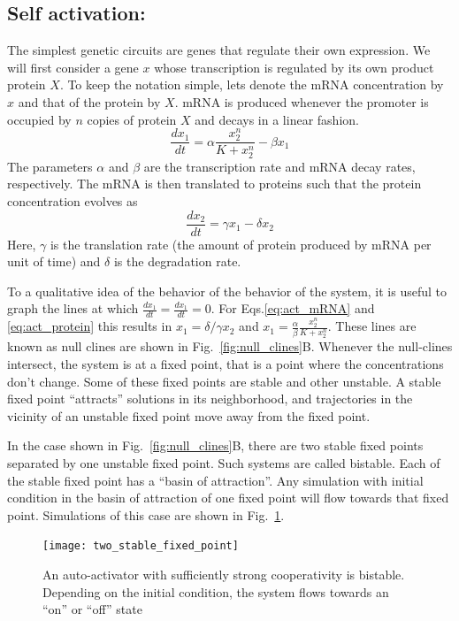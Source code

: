 \subsection*{Self activation:}
The simplest genetic circuits are genes that regulate their own expression.
We will first consider a gene $x$ whose transcription is regulated by its own product protein $X$.
To keep the notation simple, lets denote the mRNA concentration by $x$ and that of the protein by $X$.
mRNA is produced whenever the promoter is occupied by $n$ copies of protein $X$ and decays in a linear fashion.
\begin{equation}
\label{eq:act_mRNA}
	\frac{dx_1}{dt} = \alpha\frac{x_2^n}{K+x_2^n} - \beta x_1
\end{equation}
The parameters $\alpha$ and $\beta$ are the transcription rate and mRNA decay rates, respectively.
The mRNA is then translated to proteins such that the protein concentration evolves as
\begin{equation}
\label{eq:act_protein}
	\frac{dx_2}{dt} = \gamma x_1 - \delta x_2
\end{equation}
Here, $\gamma$ is the translation rate (the amount of protein produced by mRNA per unit of time) and $\delta$ is the degradation rate.

To a qualitative idea of the behavior of the behavior of the system, it is useful to graph the lines at which $\frac{dx_1}{dt}=\frac{dx_1}{dt}=0$.
For Eqs.\ref{eq:act_mRNA} and \ref{eq:act_protein} this results in $x_1=\delta/\gamma x_2$ and $x_1 = \frac{\alpha}{\beta}\frac{x_2^n}{K+x_2^n}$.
These lines are known as null clines are shown in Fig.~\ref{fig:null_clines}B.
Whenever the null-clines intersect, the system is at a fixed point, that is a point where the concentrations don't change.
Some of these fixed points are stable and other unstable.
A stable fixed point ``attracts'' solutions in its neighborhood, and trajectories in the vicinity of an unstable fixed point move away from the fixed point.

In the case shown in Fig.~\ref{fig:null_clines}B, there are two stable fixed points separated by one unstable fixed point.
Such systems are called bistable.
Each of the stable fixed point has a ``basin of attraction''.
Any simulation with initial condition in the basin of attraction of one fixed point will flow towards that fixed point.
Simulations of this case are shown in Fig.~\ref{fig:bistable}.

\begin{figure}[tb]
	\centering
	\texttt{[image: two\_stable\_fixed\_point]}
	\caption{An auto-activator with sufficiently strong cooperativity is bistable. Depending on the initial condition, the system flows towards an ``on'' or ``off'' state}
	\label{fig:bistable}
\end{figure}


